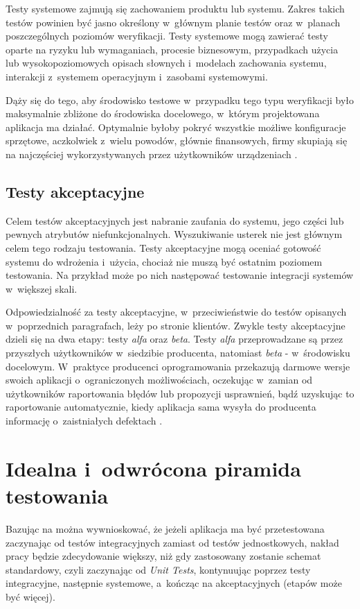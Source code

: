 Testy systemowe zajmują się zachowaniem produktu lub systemu. Zakres takich testów powinien być jasno określony w~głównym planie testów oraz w~planach poszczególnych poziomów weryfikacji. Testy systemowe mogą zawierać testy oparte na ryzyku lub wymaganiach, procesie biznesowym, przypadkach użycia lub wysokopoziomowych opisach słownych i~modelach zachowania systemu, interakcji z~systemem operacyjnym i~zasobami systemowymi.

Dąży się do tego, aby środowisko testowe w~przypadku tego typu weryfikacji było maksymalnie zbliżone do środowiska docelowego, w~którym projektowana aplikacja ma działać. Optymalnie byłoby pokryć wszystkie możliwe konfiguracje sprzętowe, aczkolwiek z~wielu powodów, głównie finansowych, firmy skupiają się na najczęściej wykorzystywanych przez użytkowników urządzeniach \cite{bib:sylabus:foundation}. 

\subsection{Testy akceptacyjne}
\label{testy_akceptacyjne}

Celem testów akceptacyjnych jest nabranie zaufania do systemu, jego części lub pewnych atrybutów niefunkcjonalnych. Wyszukiwanie usterek nie jest głównym celem tego rodzaju testowania. Testy akceptacyjne mogą oceniać gotowość systemu do wdrożenia i~użycia, chociaż nie muszą być ostatnim poziomem testowania. Na przykład może po nich następować testowanie integracji systemów w~większej skali.

Odpowiedzialność za testy akceptacyjne, w~przeciwieństwie do testów opisanych w~poprzednich paragrafach, leży po stronie klientów. Zwykle testy akceptacyjne dzieli się na dwa etapy: testy \textit{alfa} oraz \textit{beta}. Testy \textit{alfa} przeprowadzane są przez przyszłych użytkowników w~siedzibie producenta, natomiast \textit{beta} - w~środowisku docelowym. W~praktyce producenci oprogramowania przekazują darmowe wersje swoich aplikacji o~ograniczonych możliwościach, oczekując w~zamian od użytkowników raportowania błędów lub propozycji usprawnień, bądź uzyskując to raportowanie automatycznie, kiedy aplikacja sama wysyła do producenta informację o~zaistniałych defektach \cite{bib:sylabus:foundation}.

\section{Idealna i~odwrócona piramida testowania}
\label{piramida_testowania}
Bazując na \cite{bib:android:testing:learning} można wywnioskować, że jeżeli aplikacja ma być przetestowana zaczynając od testów integracyjnych zamiast od testów jednostkowych, nakład pracy będzie zdecydowanie większy, niż gdy zastosowany zostanie schemat standardowy, czyli zaczynając od \textit{Unit Tests}, kontynuując poprzez testy integracyjne, następnie systemowe, a~kończąc na akceptacyjnych (etapów może być więcej). 


